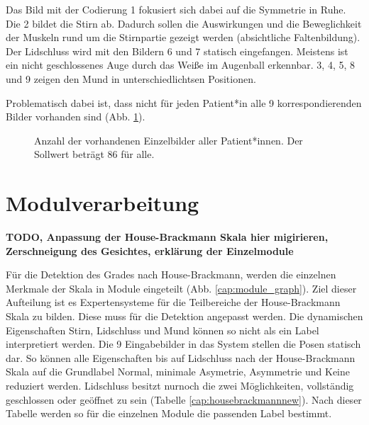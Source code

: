 Das Bild mit der Codierung 1 fokusiert sich dabei auf die Symmetrie in Ruhe. Die 2 bildet die Stirn ab. Dadurch sollen die Auswirkungen und die Beweglichkeit der Muskeln rund um die Stirnpartie gezeigt werden (absichtliche Faltenbildung). Der Lidschluss wird mit den Bildern 6 und 7 statisch eingefangen. Meistens ist ein nicht geschlossenes Auge durch das Weiße im Augenball erkennbar. 3, 4, 5, 8 und 9 zeigen den Mund in unterschiedlichtsen Positionen.

Problematisch dabei ist, dass nicht für jeden Patient*in alle 9 korrespondierenden Bilder vorhanden sind (Abb. \ref{cap:bar_code}).


\begin{figure}[!tb]\centering
{}
\caption[Anzahl der vorhandenen  Einzelbilder aller Patient*innen]{Anzahl der vorhandenen  Einzelbilder aller Patient*innen. Der Sollwert beträgt 86 für alle.}\label{cap:bar_code}
\end{figure}\label{fig:bar_code}








\clearpage
\section{Modulverarbeitung}\label{module}
\textbf{TODO, Anpassung der House-Brackmann Skala hier migirieren, Zerschneigung des Gesichtes, erklärung der Einzelmodule}

Für die Detektion des Grades nach House-Brackmann, werden die einzelnen Merkmale der Skala in Module eingeteilt (Abb. \ref{cap:module_graph}). Ziel dieser Aufteilung ist es Expertensysteme für die Teilbereiche der House-Brackmann Skala zu bilden. Diese muss für die Detektion angepasst werden. Die dynamischen Eigenschaften Stirn, Lidschluss und Mund können so nicht als ein Label interpretiert werden. Die 9 Eingabebilder in das System stellen die Posen statisch dar. So können alle Eigenschaften bis auf Lidschluss nach der House-Brackmann Skala auf die Grundlabel Normal, minimale Asymetrie, Asymmetrie und Keine reduziert werden. Lidschluss besitzt nurnoch die zwei Möglichkeiten, vollständig geschlossen oder geöffnet zu sein (Tabelle \ref{cap:housebrackmannnew}).
Nach dieser Tabelle werden so für die einzelnen Module die passenden Label bestimmt.

